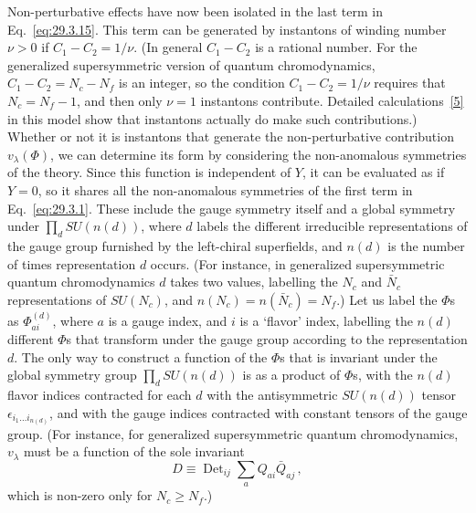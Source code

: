 Non-perturbative effects have now been isolated in the last term in
Eq.~\eqref{eq:29.3.15}. This term can be generated by instantons of winding
number \(\nu>0\) if \(C_1-C_2=1/\nu\). (In general \(C_1-C_2\) is a
rational number. For the generalized supersymmetric version of quantum
chromodynamics, \(C_1-C_2=N_c-N_f\) is an integer, so the condition
\(C_1-C_2=1/\nu\) requires that \(N_c=N_f-1\), and then only \(\nu=1\)
instantons contribute. Detailed calculations~\hyperref[ch29-ref-5]{[5]}
in this model show that instantons actually do make such contributions.)
Whether or not it is instantons that generate the non-perturbative
contribution \(v_\lambda(\Phi)\), we can determine its form by considering
the non-anomalous symmetries of the theory. Since this function is
independent of \(Y\), it can be evaluated as if \(Y=0\), so it shares all
the non-anomalous symmetries of the first term in Eq.~\eqref{eq:29.3.1}.
These include the gauge symmetry itself and a global symmetry under
\(\prod_d SU(n(d))\), where \(d\) labels the different irreducible
representations of the gauge group furnished by the left-chiral
superfields, and \(n(d)\) is the number of times representation \(d\)
occurs. (For instance, in generalized supersymmetric quantum
chromodynamics \(d\) takes two values, labelling the \(N_c\) and
\(\bar N_c\) representations of \(SU(N_c)\), and
\(n(N_c)=n(\bar N_c)=N_f\).) Let us label the \(\Phi\)s as
\(\Phi_{ai}^{(d)}\), where \(a\) is a gauge index, and \(i\) is a `flavor'
index, labelling the \(n(d)\) different \(\Phi\)s that transform under the
gauge group according to the representation \(d\). The only way to
construct a function of the \(\Phi\)s that is invariant under the global
symmetry group \(\prod_d SU(n(d))\) is as a product of \(\Phi\)s, with
the \(n(d)\) flavor indices contracted for each \(d\) with the
antisymmetric \(SU(n(d))\) tensor
\(\epsilon_{i_1\ldots i_{n(d)}}\), and with the gauge indices contracted
with constant tensors of the gauge group. (For instance, for generalized
supersymmetric quantum chromodynamics, \(v_\lambda\) must be a function of
the sole invariant
\[
  D\equiv
  \operatorname{Det}_{ij}\sum_a Q_{ai}\bar Q_{aj}\,,
\]
which is non-zero only for \(N_c\geq N_f\).)

